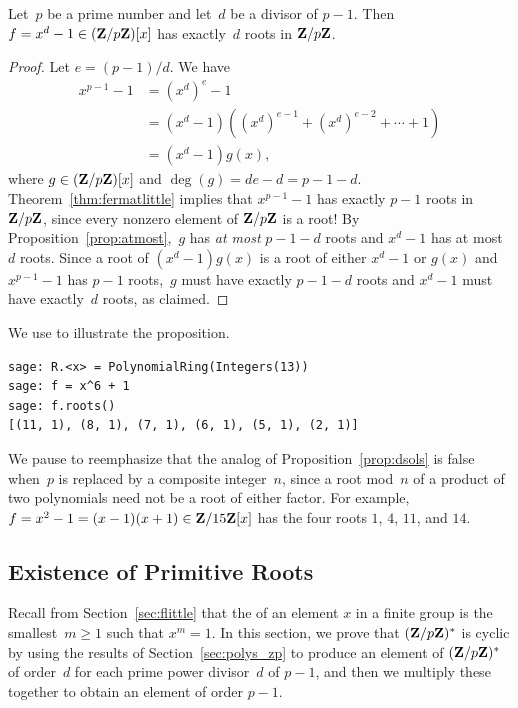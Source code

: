 \begin{proposition}\label{prop:dsols}
Let~$p$ be a prime number and let~$d$ be a divisor
of $p-1$.  Then $f = x^d-1\in(\mathbf{Z}/p\mathbf{Z}{})[x]$ has
exactly~$d$ roots in $\mathbf{Z}/p\mathbf{Z}{}$.
\end{proposition}
\begin{proof}
Let $e=(p-1)/d$. We have
\begin{align*}
x^{p-1} - 1 &= (x^d)^e - 1\\
   &= (x^d - 1)((x^d)^{e-1} + (x^d)^{e-2} + \cdots + 1)\\
   &= (x^d - 1)g(x),
\end{align*}
where $g\in (\mathbf{Z}/p\mathbf{Z}{})[x]$ and
$\deg(g) = de-d = p-1-d$.
Theorem~\ref{thm:fermatlittle}
implies that $x^{p-1}-1$ has
exactly $p-1$ roots in $\mathbf{Z}/p\mathbf{Z}{}$, since every nonzero element of
$\mathbf{Z}/p\mathbf{Z}{}$ is a root!  By Proposition~\ref{prop:atmost},~$g$
has {\em at most} $p-1-d$ roots and $x^d-1$ has at most~$d$ roots.
Since a root of $(x^d-1)g(x)$ is a root of either $x^d-1$ or $g(x)$
and $x^{p-1}-1$ has $p-1$ roots,~$g$ must have exactly $p-1-d$ roots
and $x^d-1$ must have exactly~$d$ roots, as claimed.
\end{proof}

\begin{sg}
We use \sage to illustrate the proposition.
\begin{verbatim}
sage: R.<x> = PolynomialRing(Integers(13))
sage: f = x^6 + 1
sage: f.roots()
[(11, 1), (8, 1), (7, 1), (6, 1), (5, 1), (2, 1)]
\end{verbatim}
\end{sg}

We pause to reemphasize that the analog of
Proposition~\ref{prop:dsols} is false when~$p$ is replaced by a
composite integer~$n$, since a root mod~$n$ of a product of two
polynomials need not be a root of either factor.
For example, $f = x^2-1=(x-1)(x+1)\in \mathbf{Z}/15\mathbf{Z}{}[x]$ has
the four roots $1$, $4$, $11$, and $14$.


\subsection{Existence of Primitive Roots}\label{sec:struc_zp}%
Recall from Section~\ref{sec:flittle} that the  of an
element $x$ in a finite group is the smallest~$m\geq 1$ such that
$x^m=1$.  In this section, we prove that $(\mathbf{Z}/p\mathbf{Z}{})^*$ is cyclic by
using the results of Section~\ref{sec:polys_zp} to produce an element
of $(\mathbf{Z}/p\mathbf{Z}{})^*$ of order~$d$ for each prime power divisor~$d$ of
$p-1$, and then we multiply these together to obtain an element of
order $p-1$.

